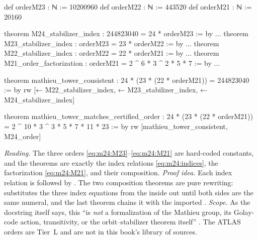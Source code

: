 \begin{leanbox}
\begin{leancode}
def orderM23 : ℕ := 10200960
def orderM22 : ℕ := 443520
def orderM21 : ℕ := 20160

theorem M24_stabilizer_index : 244823040 = 24 * orderM23 := by ...
theorem M23_stabilizer_index : orderM23 = 23 * orderM22 := by ...
theorem M22_stabilizer_index : orderM22 = 22 * orderM21 := by ...
theorem M21_order_factorization : orderM21 = 2 ^ 6 * 3 ^ 2 * 5 * 7 := by ...

theorem mathieu_tower_consistent :
    24 * (23 * (22 * orderM21)) = 244823040 := by
  rw [← M22_stabilizer_index, ← M23_stabilizer_index, ← M24_stabilizer_index]

theorem mathieu_tower_matches_certified_order :
    24 * (23 * (22 * orderM21)) = 2 ^ 10 * 3 ^ 3 * 5 * 7 * 11 * 23 := by
  rw [mathieu_tower_consistent, M24_order]
\end{leancode}
\emph{Reading.} The three orders \eqref{eq:m24:M23}--\eqref{eq:m24:M21} are hard-coded
constants, and the theorems are exactly the index relations \eqref{eq:m24:indices}, the
factorization \eqref{eq:m24:M21}, and their composition. \emph{Proof idea.} Each index
relation is  followed by . The two composition theorems are
pure rewriting:  substitutes the three index equations from
the inside out until both sides are the same numeral, and the last theorem chains it with
the imported  . \emph{Scope.} As the
docstring itself says, this ``is \emph{not} a formalization of the Mathieu group, its
Golay-code action, transitivity, or the orbit--stabilizer theorem itself''
. The ATLAS orders are Tier~L and are not in this
book's library of sources.
\end{leanbox}

